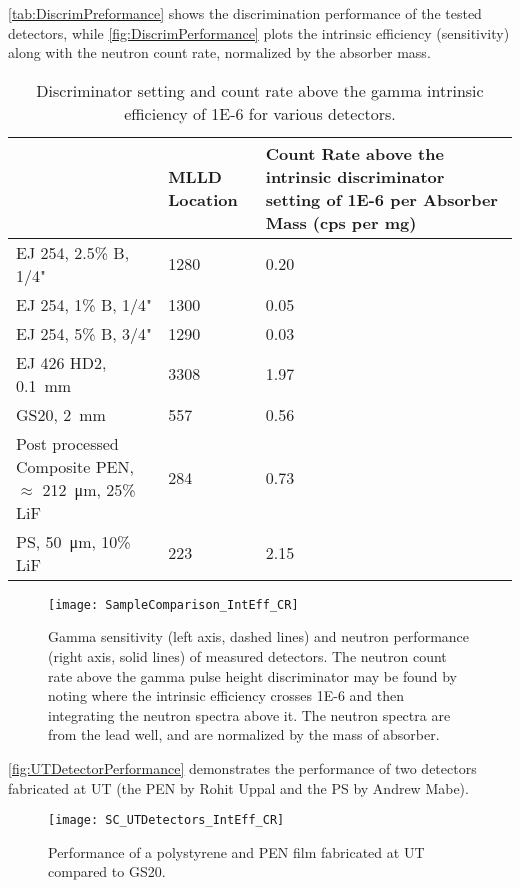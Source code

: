\documentclass[onecolumn]{IEEEtran}
\begin{document}
\autoref{tab:DiscrimPreformance} shows the discrimination performance of the tested detectors, while \autoref{fig:DiscrimPerformance} plots the intrinsic efficiency (sensitivity) along with the neutron count rate, normalized by the absorber mass.
\begin{table}
  \centering
  \caption[Discrimination Performance]{Discriminator setting and count rate above the gamma intrinsic efficiency of \num{1E-6} for various detectors.}
  \label{tab:DiscrimPreformance}
  \begin{tabular}{m{4cm} | m{2cm} m{4cm}}
    \toprule
    &	MLLD Location	&	Count Rate above the intrinsic discriminator setting of \num{1E-6} per Absorber Mass (cps per mg)	\\
    \midrule
    EJ 254, 2.5\% B, 1/4"	&	1280	&	0.20	\\
    EJ 254, 1\% B, 1/4"	&	1300	&	0.05	\\
    EJ 254, 5\% B, 3/4"	&	1290		&	0.03	\\
    EJ 426 HD2, \SI{0.1}{\mm}&	3308		&	1.97	\\
    GS20, \SI{2}{\mm}	&	557		&	0.56	\\
    Post processed Composite PEN, $\approx$ \SI{212}{\um}, 25\% LiF	&	284	&	0.73	\\
    PS, \SI{50}{\um}, 10\% LiF & 223 & 2.15\\
    \bottomrule
\end{tabular}
\end{table}
\begin{figure}
  \centering
  \texttt{[image: SampleComparison\_IntEff\_CR]}
  \caption[Gamma Sensitivity and Neutron Response of Measured Detectors]{Gamma sensitivity (left axis, dashed lines) and neutron performance (right axis, solid lines) of measured detectors.  The neutron count rate above the gamma pulse height discriminator may be found by noting where the intrinsic efficiency crosses \num{1E-6} and then integrating the neutron spectra above it. The neutron spectra are from the lead well, and are normalized by the mass of absorber.}
  \label{fig:DiscrimPerformance}
\end{figure}
\autoref{fig:UTDetectorPerformance} demonstrates the performance of two detectors fabricated at UT (the PEN by Rohit Uppal and the PS by Andrew Mabe).
\begin{figure}
  \centering
  \texttt{[image: SC\_UTDetectors\_IntEff\_CR]}
  \caption[UT Fabricated Detector Performance]{Performance of a polystyrene and PEN film fabricated at UT compared to GS20.}
  \label{fig:UTDetectorPreformance}
\end{figure}
\end{document}
